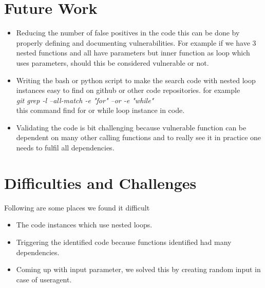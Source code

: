 \documentclass[authoryear,preprint]{sigplanconf}
\begin{document}
\section{Future Work}
\begin{itemize}
\item Reducing the number of false positives in the code this can be done by properly defining and documenting vulnerabilities. For example if we have 3 nested functions and all have parameters but inner function as loop which uses parameters, should this be considered vulnerable or not.
\item Writing the bash or python script to make the search code with nested loop instances easy to find on github or other code repositories.
for example \\
 \textit{git grep -l --all-match -e "for" --or -e "while"} \\
this command find for or while loop instance in code.
\item Validating the code is bit challenging because vulnerable function can be dependent on many other calling functions and to really see it in practice one needs to fulfil all dependencies.


\end{itemize}

\section{Difficulties and Challenges}

Following are some places we found it difficult
\begin{itemize}
\item The code instances which use nested loops.
\item Triggering the identified code because functions identified had many dependencies.
\item Coming up with input parameter, we solved this by creating random input in case of useragent.
\end{itemize}
\end{document}
